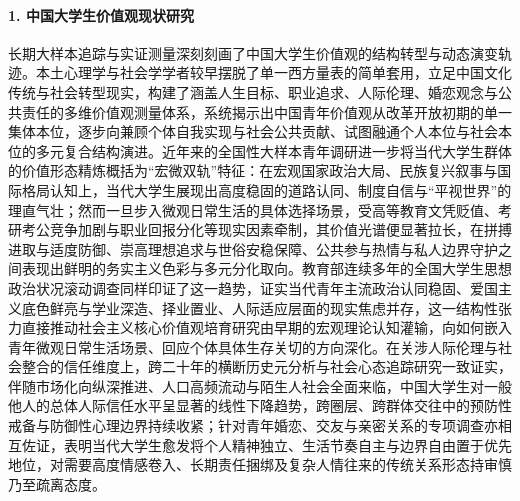 \paragraph{1. 中国大学生价值观现状研究}
长期大样本追踪与实证测量深刻刻画了中国大学生价值观的结构转型与动态演变轨迹。本土心理学与社会学学者较早摆脱了单一西方量表的简单套用，立足中国文化传统与社会转型现实，构建了涵盖人生目标、职业追求、人际伦理、婚恋观念与公共责任的多维价值观测量体系，系统揭示出中国青年价值观从改革开放初期的单一集体本位，逐步向兼顾个体自我实现与社会公共贡献、试图融通个人本位与社会本位的多元复合结构演进\cite{Huang2005,BJSF200303008}。近年来的全国性大样本青年调研进一步将当代大学生群体的价值形态精炼概括为“宏微双轨”特征：在宏观国家政治大局、民族复兴叙事与国际格局认知上，当代大学生展现出高度稳固的道路认同、制度自信与“平视世界”的理直气壮；然而一旦步入微观日常生活的具体选择场景，受高等教育文凭贬值、考研考公竞争加剧与职业回报分化等现实因素牵制，其价值光谱便显著拉长，在拼搏进取与适度防御、崇高理想追求与世俗安稳保障、公共参与热情与私人边界守护之间表现出鲜明的务实主义色彩与多元分化取向\cite{Lian2024b}。教育部连续多年的全国大学生思想政治状况滚动调查同样印证了这一趋势，证实当代青年主流政治认同稳固、爱国主义底色鲜亮与学业深造、择业置业、人际适应层面的现实焦虑并存\cite{Shen2022}，这一结构性张力直接推动社会主义核心价值观培育研究由早期的宏观理论认知灌输，向如何嵌入青年微观日常生活场景、回应个体具体生存关切的方向深化\cite{Feng2022}。在关涉人际伦理与社会整合的信任维度上，跨二十年的横断历史元分析与社会心态追踪研究一致证实，伴随市场化向纵深推进、人口高频流动与陌生人社会全面来临，中国大学生对一般他人的总体人际信任水平呈显著的线性下降趋势，跨圈层、跨群体交往中的预防性戒备与防御性心理边界持续收紧\cite{XLXD201203004,Xin2020}；针对青年婚恋、交友与亲密关系的专项调查亦相互佐证，表明当代大学生愈发将个人精神独立、生活节奏自主与边界自由置于优先地位，对需要高度情感卷入、长期责任捆绑及复杂人情往来的传统关系形态持审慎乃至疏离态度\cite{FengXiaotian2018}。

